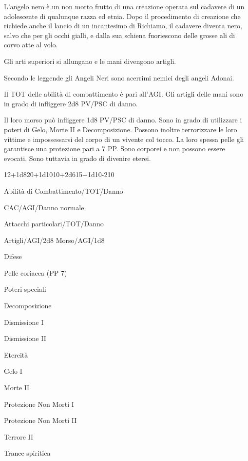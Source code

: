 
L'angelo nero \`e un non morto frutto di una creazione operata sul
cadavere di un adolescente di qualunque razza ed etnia. Dopo il
procedimento di creazione che richiede anche il lancio di un
incantesimo di Richiamo, il cadavere diventa nero, salvo che per gli
occhi gialli, e dalla sua schiena fuoriescono delle grosse ali di
corvo atte al volo. 

Gli arti superiori si allungano e le mani divengono artigli. 

Secondo le leggende gli Angeli Neri sono acerrimi nemici degli
angeli Adonai.

Il TOT delle abilit\`a di
combattimento \`e pari all'AGI. Gli artigli delle mani sono in grado
di infliggere 2d8 PV/PSC di danno.  

Il loro morso pu\`o infliggere 1d8 PV/PSC di danno. Sono in grado di
utilizzare i poteri di Gelo, Morte II e Decomposizione. Possono
inoltre terrorizzare le loro vittime e impossessarsi del corpo di un
vivente col tocco. La loro spessa pelle gli garantisce una protezione
pari a 7 PP. Sono corporei e non possono essere evocati. Sono tuttavia
in grado di divenire eterei.

{12+1d8}{20+1d10}{10+2d6}{15+1d10}{-}{210}

\begin{parmostro}{Abilit\`a di Combattimento/TOT/Danno}
\item CAC/AGI/Danno normale
\end{parmostro}

\begin{parmostro}{Attacchi particolari/TOT/Danno}
\item Artigli/AGI/2d8 Morso/AGI/1d8
\end{parmostro}

\begin{parmostro}{Difese}
\item Pelle coriacea (PP 7)
\end{parmostro}

\begin{parmostro}{Poteri speciali}
\item Decomposizione
\item Dismissione I
\item Dismissione II
\item Etereit\`a
\item Gelo I
\item Morte II
\item Protezione Non Morti I
\item Protezione Non Morti II
\item Terrore II
\item Trance spiritica
\end{parmostro}

